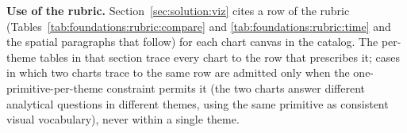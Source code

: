 \noindent\textbf{Use of the rubric.} Section~\ref{sec:solution:viz} cites a row of
the rubric (Tables~\ref{tab:foundations:rubric:compare} and
\ref{tab:foundations:rubric:time} and the spatial paragraphs that follow)
for each chart canvas in the catalog. The per-theme tables in that section trace every chart to
the row that prescribes it; cases in which two charts trace to the
same row are admitted only when the one-primitive-per-theme constraint permits it (the two
charts answer different analytical questions in different themes,
using the same primitive as consistent visual vocabulary), never
within a single theme.

